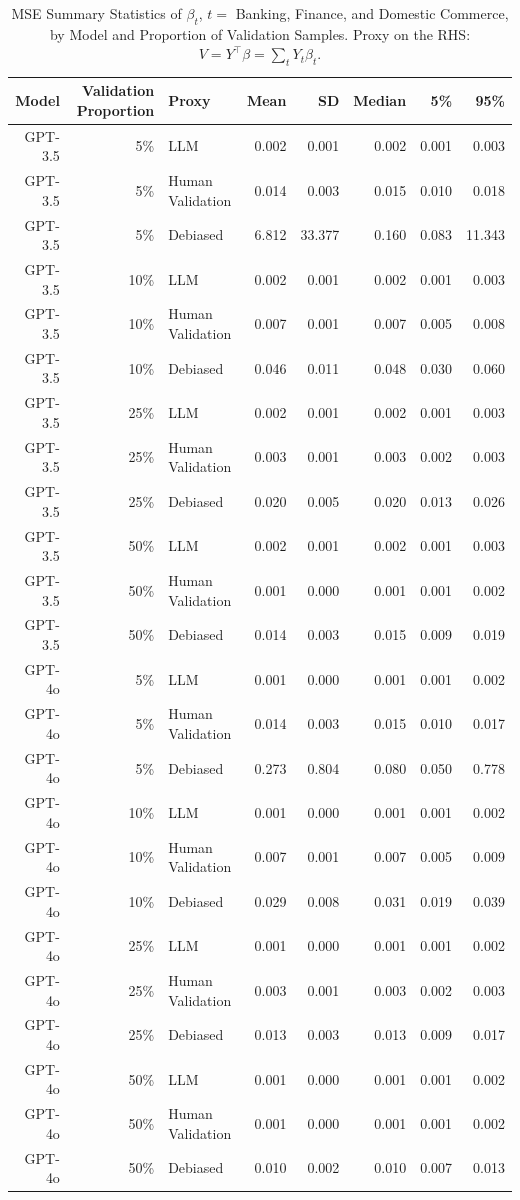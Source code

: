\begin{table}

\caption{MSE Summary Statistics of $\beta_{t}$, $t=$ Banking, Finance, and Domestic Commerce, by Model and Proportion of Validation Samples.
      Proxy on the RHS: $V = Y^\top \beta = \sum_{t} Y_t \beta_t$.}
\centering
\begin{tabular}[t]{rrlrrrrr}
\toprule
Model & Validation Proportion & Proxy & Mean & SD & Median & 5\% & 95\%\\
\midrule
GPT-3.5 & 5\% & LLM & 0.002 & 0.001 & 0.002 & 0.001 & 0.003\\
GPT-3.5 & 5\% & Human Validation & 0.014 & 0.003 & 0.015 & 0.010 & 0.018\\
GPT-3.5 & 5\% & Debiased & 6.812 & 33.377 & 0.160 & 0.083 & 11.343\\
GPT-3.5 & 10\% & LLM & 0.002 & 0.001 & 0.002 & 0.001 & 0.003\\
GPT-3.5 & 10\% & Human Validation & 0.007 & 0.001 & 0.007 & 0.005 & 0.008\\
GPT-3.5 & 10\% & Debiased & 0.046 & 0.011 & 0.048 & 0.030 & 0.060\\
GPT-3.5 & 25\% & LLM & 0.002 & 0.001 & 0.002 & 0.001 & 0.003\\
GPT-3.5 & 25\% & Human Validation & 0.003 & 0.001 & 0.003 & 0.002 & 0.003\\
GPT-3.5 & 25\% & Debiased & 0.020 & 0.005 & 0.020 & 0.013 & 0.026\\
GPT-3.5 & 50\% & LLM & 0.002 & 0.001 & 0.002 & 0.001 & 0.003\\
GPT-3.5 & 50\% & Human Validation & 0.001 & 0.000 & 0.001 & 0.001 & 0.002\\
GPT-3.5 & 50\% & Debiased & 0.014 & 0.003 & 0.015 & 0.009 & 0.019\\
GPT-4o & 5\% & LLM & 0.001 & 0.000 & 0.001 & 0.001 & 0.002\\
GPT-4o & 5\% & Human Validation & 0.014 & 0.003 & 0.015 & 0.010 & 0.017\\
GPT-4o & 5\% & Debiased & 0.273 & 0.804 & 0.080 & 0.050 & 0.778\\
GPT-4o & 10\% & LLM & 0.001 & 0.000 & 0.001 & 0.001 & 0.002\\
GPT-4o & 10\% & Human Validation & 0.007 & 0.001 & 0.007 & 0.005 & 0.009\\
GPT-4o & 10\% & Debiased & 0.029 & 0.008 & 0.031 & 0.019 & 0.039\\
GPT-4o & 25\% & LLM & 0.001 & 0.000 & 0.001 & 0.001 & 0.002\\
GPT-4o & 25\% & Human Validation & 0.003 & 0.001 & 0.003 & 0.002 & 0.003\\
GPT-4o & 25\% & Debiased & 0.013 & 0.003 & 0.013 & 0.009 & 0.017\\
GPT-4o & 50\% & LLM & 0.001 & 0.000 & 0.001 & 0.001 & 0.002\\
GPT-4o & 50\% & Human Validation & 0.001 & 0.000 & 0.001 & 0.001 & 0.002\\
GPT-4o & 50\% & Debiased & 0.010 & 0.002 & 0.010 & 0.007 & 0.013\\
\bottomrule
\end{tabular}
\end{table}
